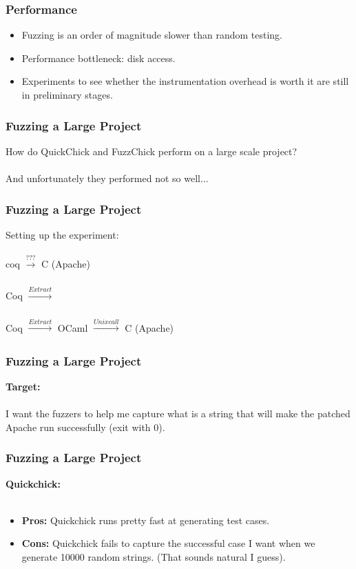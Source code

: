\documentclass{beamer}
\begin{document}
\begin{frame}
  \frametitle{Performance}
  \begin{itemize}
  \item Fuzzing is an order of magnitude slower than random testing.
  \item Performance bottleneck: disk access.
  \item Experiments to see whether the instrumentation overhead is worth it are
    still in preliminary stages.
  \end{itemize}
\end{frame}

\begin{frame}
  \frametitle{Fuzzing a Large Project}
  How do QuickChick and FuzzChick perform on a large scale project? \\~\\
 
  \pause
  And unfortunately they performed not so well...
    
\end{frame}

\begin{frame}
\frametitle{Fuzzing a Large Project}
Setting up the experiment: \\~\\

coq $\xrightarrow[]{???}$ C (Apache) \\~\\

\pause{}
Coq $\xrightarrow[]{Extract}$  \\~\\

\pause{}
Coq $\xrightarrow[]{Extract}$ OCaml $\xrightarrow[]{Unix call}$ C (Apache)

\end{frame}

\begin{frame}
\frametitle{Fuzzing a Large Project}

\textbf {Target:} \\~\\
I want the fuzzers to help me capture what is a string that will make the patched Apache run successfully (exit with 0).
    
\end{frame}

\begin{frame}
\frametitle{Fuzzing a Large Project}

\textbf{Quickchick:} \\~\\

\begin{itemize}
    \item \textbf{Pros:} Quickchick runs pretty fast at generating test cases.
    
    \item \textbf{Cons:} Quickchick fails to capture the successful case I want when we generate 10000 random strings. (That sounds natural I guess).
\end{itemize}

\end{frame}
\end{document}
